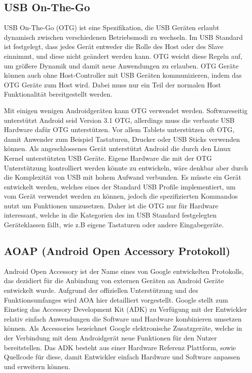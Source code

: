 \documentclass[12pt,journal,compsoc]{IEEEtran}
\begin{document}
\subsection{USB On-The-Go}
USB On-The-Go (OTG) ist eine Spezifikation, die USB Geräten erlaubt dynamisch zwischen verschiedenen Betriebsmodi zu wechseln. 
Im USB Standard ist festgelegt, dass jedes Gerät entweder die Rolle des Host oder des Slave einnimmt, und diese nicht geändert werden kann. 
OTG weicht diese Regeln auf, um größere Dynamik und damit neue Anwendungen zu erlauben.
OTG Geräte können auch ohne Host-Controller mit USB Geräten kommunizieren, indem das OTG Geräte zum Host wird.
Dabei muss nur ein Teil der normalen Host Funktionalität bereitgestellt werden.

Mit einigen wenigen Androidgeräten kann OTG verwendet werden.
Softwareseitig unterstützt Android seid Version 3.1 OTG,
allerdings muss die verbaute USB Hardware dafür OTG unterstützen.
Vor allem Tablets unterstützen oft OTG, damit Anwender zum Beispiel Tastaturen, Drucker oder USB Sticks verwenden können.
Als angeschlossenes Gerät unterstützt Android die durch den Linux Kernel unterstützten USB Geräte.
Eigene Hardware die mit der OTG Unterstützung kontrolliert werden könnte zu entwickeln, wäre denkbar aber durch die Komplexität von USB mit hohem Aufwand verbunden.
Es müsste ein Gerät entwickelt werden, welches eines der Standard USB Profile implementiert, um vom Gerät verwendet werden zu können, jedoch die spezifizierten Kommandos nutzt um Funktionen umzusetzen.
Daher ist die OTG nur für Hardware interessant, welche in die Kategorien des im USB Standard festgelegten Geräteklassen fällt, wie z.B eigene Tastaturen oder andere Eingabegeräte. 

\subsection{AOAP (Android Open Accessory Protokoll)}
Android Open Accessory ist der Name eines von Google entwickelten Protokolls, das 
dezidiert für die Anbindung von externen Geräten an Android Geräte entwickelt wurde.
Aufgrund der offiziellen Unterstützung und des Funktionsumfanges wird AOA hier detailliert vorgestellt.
Google stellt zum Einstieg das Accessory Development Kit (ADK) zu Verfügung mit der Entwickler relativ einfach Anwendungen die Software und Hardware kombinieren umsetzen können.
Als Accessories bezeichnet Google elektronische Zusatzgeräte, welche in der Verbindung mit dem Androidgerät neue Funktionen für den Nutzer bereitstellen.
Das ADK besteht aus einer Hardware Referenz Plattform, sowie Quellcode für diese, damit 
Entwickler einfach Hardware und Software anpassen und erweitern können.
\cite{developaoa}
\end{document}
